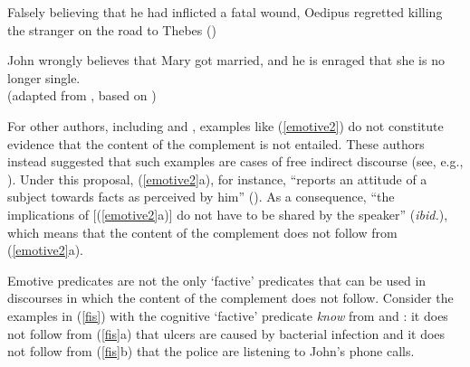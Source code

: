 \documentclass[11pt,fleqn]{article}
\newcommand{\6}{\mbox{$[\hspace*{-.6mm}[$}}
\newcommand{\9}{\mbox{$]\hspace*{-.6mm}]$}}
\begin{document}
\begin{exe}

\ex\label{emotive2}

\begin{xlist}

\ex Falsely believing that he had inflicted a fatal wound, Oedipus regretted killing the stranger on the road to Thebes \hfill (\citealt{klein1975})

\ex John wrongly believes that Mary got married, and he is enraged that she is no longer single. \\ \hspace*{.2cm} \hfill (adapted from \citealt{egre2008}, based on \citealt{schlenker03})

\end{xlist}

\end{exe}

For other authors, including \citet{gazdar79a} and \citet{abrusan2011}, examples like (\ref{emotive2}) do not constitute evidence that the content of the complement is not entailed. These authors instead suggested that such examples are cases of free indirect discourse (see, e.g., \citealt{eckardt2014}). Under this proposal, (\ref{emotive2}a), for instance, ``reports an attitude of a subject towards facts as perceived by him'' (\citealt[514]{abrusan2011}). As a consequence, ``the implications of [(\ref{emotive2}a)] do not have to be shared by the speaker''  ({\em ibid.}), which means that the content of the complement does not follow from (\ref{emotive2}a).

Emotive predicates are not the only `factive' predicates that can be used in discourses in which the content of the complement does not follow. Consider the examples in (\ref{fis}) with the cognitive `factive' predicate {\em know} from  \citealt{hazlett2010} and \citealt{abrusan2011}:  it does not follow from (\ref{fis}a) that ulcers are caused by bacterial infection and it does not follow from (\ref{fis}b) that the police are listening to John's phone calls. 
\end{document}
